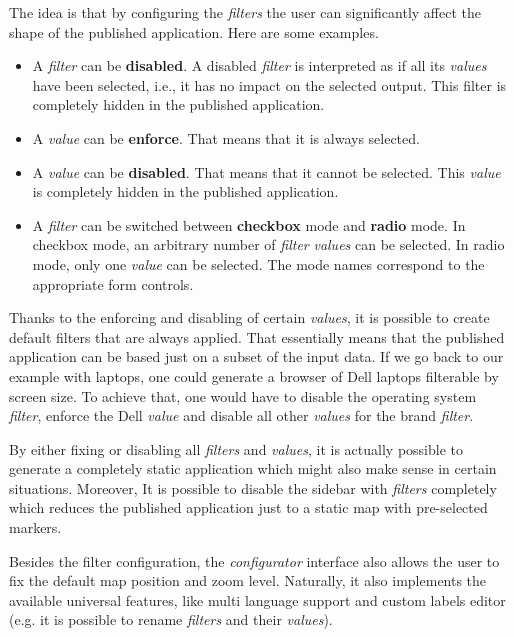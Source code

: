 The idea is that by configuring the \emph{filters} the user can significantly affect the shape of the published application. Here are some examples.

\begin{itemize}
\item A \emph{filter} can be \textbf{disabled}. A disabled \emph{filter} is interpreted as if all its \emph{values} have been selected, i.e., it has no impact on the selected output. This filter is completely hidden in the published application.
\item A \emph{value} can be \textbf{enforce}. That means that it is always selected.
\item A \emph{value} can be \textbf{disabled}. That means that it cannot be selected. This \emph{value} is completely hidden in the published application.
\item A \emph{filter} can be switched between \textbf{checkbox} mode and \textbf{radio} mode. In checkbox mode, an arbitrary number of \emph{filter} \emph{values} can be selected. In radio mode, only one \emph{value} can be selected. The mode names correspond to the appropriate form controls.

\end{itemize}
Thanks to the enforcing and disabling of certain \emph{values}, it is possible to create default filters that are always applied. That essentially means that the published application can be based just on a subset of the input data. If we go back to our example with laptops, one could generate a browser of Dell laptops filterable by screen size. To achieve that, one would have to disable the operating system \emph{filter}, enforce the Dell \emph{value} and disable all other \emph{values} for the brand \emph{filter}.

By either fixing or disabling all \emph{filters} and \emph{values}, it is actually possible to generate a completely static application which might also make sense in certain situations. Moreover, It is possible to disable the sidebar with \emph{filters} completely which reduces the published application just to a static map with pre-selected markers.

Besides the filter configuration, the \emph{configurator} interface also allows the user to fix the default map position and zoom level. Naturally, it also implements the available universal features, like multi language support and custom labels editor (e.g. it is possible to rename \emph{filters}  and their \emph{values}).

